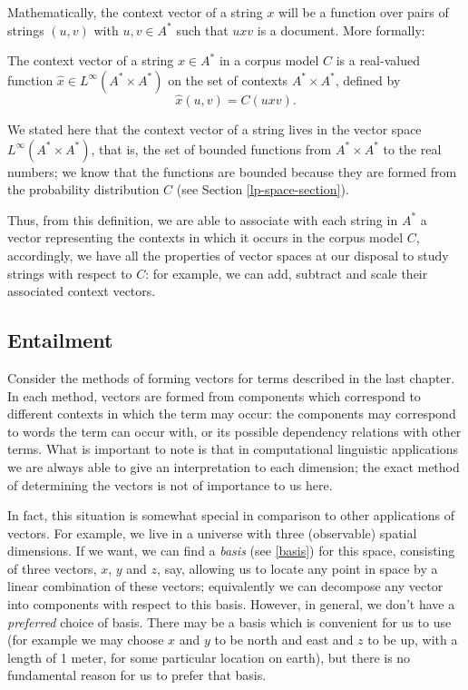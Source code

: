 Mathematically, the context vector of a string $x$ will be a function over pairs of strings $(u,v)$ with $u,v \in A^*$ such that $uxv$ is a document. More formally:
\begin{defn}
The context vector of a string $x \in A^*$ in a corpus model $C$ is a real-valued function $\hat{x}\in L^\infty(A^*\times A^*)$  on the set of contexts $A^* \times A^*$, defined by
$$\hat{x}(u,v) = C(uxv).$$
\end{defn}

We stated here that the context vector of a string lives in the vector space $L^\infty(A^*\times A^*)$, that is, the set of bounded functions from $A^*\times A^*$ to the real numbers; we know that the functions are bounded because they are formed from the probability distribution $C$ (see Section \ref{lp-space-section}).

Thus, from this definition, we are able to associate with each string in $A^*$ a vector representing the contexts in which it occurs in the corpus model $C$, accordingly, we have all the properties of vector spaces at our disposal to study strings with respect to $C$: for example, we can add, subtract and scale their associated context vectors.


\subsection{Entailment}

Consider the methods of forming vectors for terms described in the last chapter. In each method, vectors are formed from components which correspond to different contexts in which the term may occur: the components may correspond to words the term can occur with, or its possible dependency relations with other terms. What is important to note is that in computational linguistic applications we are always able to give an interpretation to each dimension; the exact method of determining the vectors is not of importance to us here.

In fact, this situation is somewhat special in comparison to other applications of vectors. For example, we live in a universe with three (observable) spatial dimensions. If we want, we can find a \emph{basis} (see \ref{basis}) for this space, consisting of three vectors, $x$, $y$ and $z$, say, allowing us to locate any point in space by a linear combination of these vectors; equivalently we can decompose any vector into components with respect to this basis. However, in general, we don't have a \emph{preferred} choice of basis. There may be a basis which is convenient for us to use (for example we may choose $x$ and $y$ to be north and east and $z$ to be up, with a length of 1 meter, for some particular location on earth), but there is no fundamental reason for us to prefer that basis.

